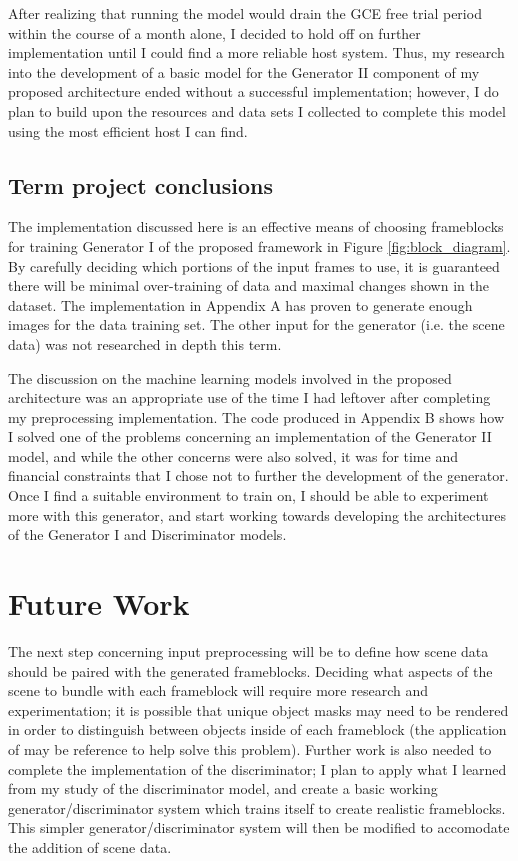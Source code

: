 \documentclass[conference]{IEEEtran}
\begin{document}
After realizing that running the
model would drain the GCE free trial period within the course of a month alone, I
decided to hold off on further implementation until I could find a more reliable
host system. Thus, my research into the development of a basic model for the
Generator II component of my proposed architecture ended without a successful
implementation; however, I do plan to build upon the resources and data sets I
collected to complete this model using the most efficient host I can find.

\subsection{Term project conclusions}
\label{subsec:term_conclusions}
The implementation discussed here is an effective means of choosing frameblocks
for training Generator I of the proposed framework in Figure \ref{fig:block_diagram}.
By carefully deciding which portions of the input frames to use,
it is guaranteed there will be minimal over-training of data and maximal changes shown in the dataset.
The implementation in Appendix A has proven to generate enough images for the
data training set.
The other input for the generator (i.e. the scene data) was not researched in
depth this term.

The discussion on the machine learning models involved in the proposed
architecture was an appropriate use of the time I had leftover after completing
my preprocessing implementation. The code produced in Appendix B shows how I
solved one of the problems concerning an implementation of the Generator II
model, and while the other concerns were also solved, it was for time and
financial constraints that I chose not to further the development of the
generator. Once I find a suitable environment to train on, I should be able to
experiment more with this generator, and start working towards developing the
architectures of the Generator I and Discriminator models.

\section{Future Work}
\label{sec:future_work}
The next step concerning input preprocessing will be to define how
scene data should be paired with the generated frameblocks.
Deciding what aspects of the scene to bundle with each
frameblock will require more research and experimentation;
it is possible that unique object masks may need to be rendered in order to
distinguish between objects inside of each frameblock
(the application of \cite{posecnn} may be reference to help solve
this problem).
Further work is also needed to complete the implementation of the discriminator;
I plan to apply what I learned from my study of the discriminator model, and
create a basic working generator/discriminator system which trains itself to
create realistic frameblocks. This simpler generator/discriminator system will
then be modified to accomodate the addition of scene data.
\end{document}

